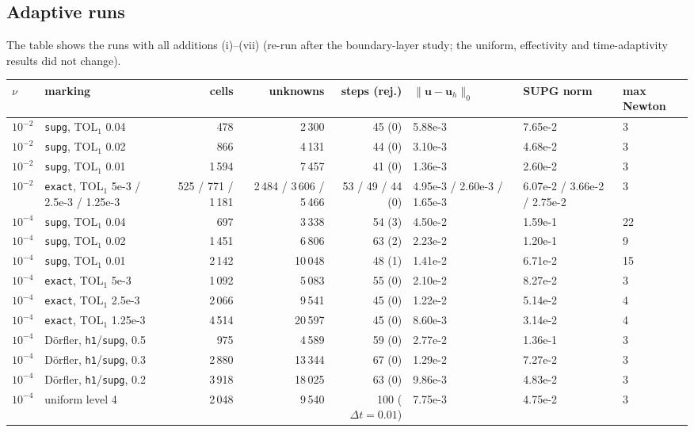 \documentclass[11pt,a4paper]{article}
\newcommand{\bu}{\boldsymbol{u}}
\newcommand{\dt}{\Delta t}
\newcommand{\code}[1]{\texttt{#1}}
\begin{document}
\subsection{Adaptive runs}

The table shows the runs with all additions (i)--(vii) (re-run after the boundary-layer study; the uniform, effectivity and
time-adaptivity results did not change).
\begin{center}\begin{adjustbox}{max width=\textwidth}
\begin{tabular}{llrrrlll}
\toprule
$\nu$ & marking & cells & unknowns & steps (rej.) & $\|\bu-\bu_h\|_0$ & SUPG norm & max Newton\\
\midrule
$10^{-2}$ & \code{supg}, TOL$_1$ 0.04 & 478 & 2\,300 & 45 (0) & 5.88e-3 & 7.65e-2 & 3\\
$10^{-2}$ & \code{supg}, TOL$_1$ 0.02 & 866 & 4\,131 & 44 (0) & 3.10e-3 & 4.68e-2 & 3\\
$10^{-2}$ & \code{supg}, TOL$_1$ 0.01 & 1\,594 & 7\,457 & 41 (0) & 1.36e-3 & 2.60e-2 & 3\\
$10^{-2}$ & \code{exact}, TOL$_1$ 5e-3 / 2.5e-3 / 1.25e-3 & 525 / 771 / 1\,181 & 2\,484 / 3\,606 / 5\,466 & 53 / 49 / 44 (0) & 4.95e-3 / 2.60e-3 / 1.65e-3 & 6.07e-2 / 3.66e-2 / 2.75e-2 & 3\\
\midrule
$10^{-4}$ & \code{supg}, TOL$_1$ 0.04 & 697 & 3\,338 & 54 (3) & 4.50e-2 & 1.59e-1 & 22\\
$10^{-4}$ & \code{supg}, TOL$_1$ 0.02 & 1\,451 & 6\,806 & 63 (2) & 2.23e-2 & 1.20e-1 & 9\\
$10^{-4}$ & \code{supg}, TOL$_1$ 0.01 & 2\,142 & 10\,048 & 48 (1) & 1.41e-2 & 6.71e-2 & 15\\
$10^{-4}$ & \code{exact}, TOL$_1$ 5e-3 & 1\,092 & 5\,083 & 55 (0) & 2.10e-2 & 8.27e-2 & 3\\
$10^{-4}$ & \code{exact}, TOL$_1$ 2.5e-3 & 2\,066 & 9\,541 & 45 (0) & 1.22e-2 & 5.14e-2 & 4\\
$10^{-4}$ & \code{exact}, TOL$_1$ 1.25e-3 & 4\,514 & 20\,597 & 45 (0) & 8.60e-3 & 3.14e-2 & 4\\
$10^{-4}$ & D\"orfler, \code{h1}/\code{supg}, 0.5 & 975 & 4\,589 & 59 (0) & 2.77e-2 & 1.36e-1 & 3\\
$10^{-4}$ & D\"orfler, \code{h1}/\code{supg}, 0.3 & 2\,880 & 13\,344 & 67 (0) & 1.29e-2 & 7.27e-2 & 3\\
$10^{-4}$ & D\"orfler, \code{h1}/\code{supg}, 0.2 & 3\,918 & 18\,025 & 63 (0) & 9.86e-3 & 4.83e-2 & 3\\
\midrule
$10^{-4}$ & uniform level 4 & 2\,048 & 9\,540 & 100 ($\dt=0.01$) & 7.75e-3 & 4.75e-2 & 3\\
\bottomrule
\end{tabular}
\end{adjustbox}\end{center}
\end{document}
